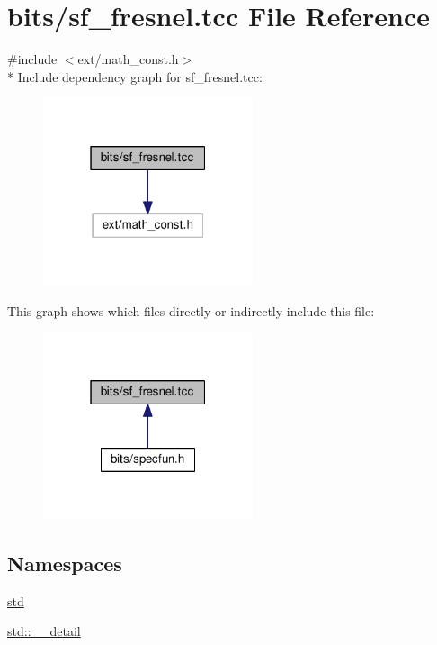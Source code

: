 \hypertarget{sf__fresnel_8tcc}{}\section{bits/sf\+\_\+fresnel.tcc File Reference}
\label{sf__fresnel_8tcc}
{\ttfamily \#include $<$ext/math\+\_\+const.\+h$>$}\\*
Include dependency graph for sf\+\_\+fresnel.\+tcc\+:
\nopagebreak
\begin{figure}[H]
\begin{center}
\leavevmode
\includegraphics[width=175pt]{sf__fresnel_8tcc__incl}
\end{center}
\end{figure}
This graph shows which files directly or indirectly include this file\+:
\nopagebreak
\begin{figure}[H]
\begin{center}
\leavevmode
\includegraphics[width=175pt]{sf__fresnel_8tcc__dep__incl}
\end{center}
\end{figure}
\subsection*{Namespaces}
\begin{DoxyCompactItemize}
\item 
 \hyperlink{namespacestd}{std}
\item 
 \hyperlink{namespacestd_1_1____detail}{std\+::\+\_\+\+\_\+detail}
\end{DoxyCompactItemize}
